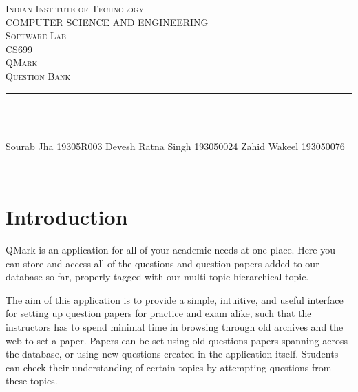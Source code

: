\documentclass[13pt]{article}
\makeatletter
\let\thetitle\@title
\makeatother
\begin{document}

\begin{titlepage}
	\centering
    \vspace*{0.5 cm}
    \textsc{\LARGE Indian Institute of Technology}\\[2.0 cm]
    \textsc{\lARGE COMPUTER SCIENCE AND ENGINEERING}\\[0.2 cm]
    \textsc{\lARGE Software Lab}\\[0.2 cm]
	\textsc{\Large CS699}\\[0.5 cm]				%
	\textsc{\large QMark\\Question Bank}\\[0.2 cm]
	\rule{\linewidth}{0.2 mm} \\[0.4 cm]
	{ \huge \bfseries \thetitle}\\
	
	
	\begin{minipage}{0.4\textwidth}
		
			\begin{flushright} 
			Sourab Jha 19305R003\linebreak
			Devesh Ratna Singh 193050024\linebreak
			Zahid Wakeel 193050076\linebreak
			
		\end{flushright}
	\end{minipage}\\[2 cm]
	

 
	\vfill
	
\end{titlepage}

\tableofcontents
\pagebreak


\section{Introduction}

\justifying
QMark is an application for all of your academic needs at one place. Here you can store and access all of the questions and question papers added to our database so far, properly tagged with our multi-topic hierarchical topic. \par The aim of this application is to provide a simple, intuitive, and useful interface for setting up question papers for practice and exam alike, such that the instructors has to spend minimal time in browsing through old archives and the web to set a paper. Papers can be set using old questions papers spanning across the database, or using new questions created in the application itself. Students can check their understanding of certain topics by attempting questions from these topics.
\end{document}
